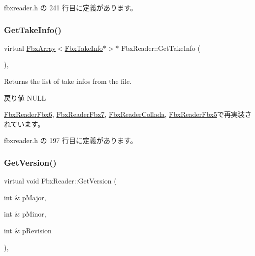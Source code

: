  fbxreader.\+h の 241 行目に定義があります。

\mbox{\label{class_fbx_reader_a9d7b40684bb3181219945eb0c73fb9d1}} 
\subsubsection{\texorpdfstring{Get\+Take\+Info()}{GetTakeInfo()}}
{\footnotesize\ttfamily virtual \hyperlink{class_fbx_array}{Fbx\+Array}$<$\hyperlink{class_fbx_take_info}{Fbx\+Take\+Info}$\ast$$>$$\ast$ Fbx\+Reader\+::\+Get\+Take\+Info (\begin{DoxyParamCaption}{ }\end{DoxyParamCaption})\hspace{0.3cm}{\ttfamily [inline]}, {\ttfamily [virtual]}}

Returns the list of take infos from the file. \begin{DoxyReturn}{戻り値}
N\+U\+LL 
\end{DoxyReturn}


\hyperlink{class_fbx_reader_fbx6_a6f90870b7572e7fcbc9832679a89d5f4}{Fbx\+Reader\+Fbx6}, \hyperlink{class_fbx_reader_fbx7_a220f07e0cb0c171279e1f98e0433bbee}{Fbx\+Reader\+Fbx7}, \hyperlink{class_fbx_reader_collada_af772ad8fc79672d06aa9ea6910b81ab0}{Fbx\+Reader\+Collada}, \hyperlink{class_fbx_reader_fbx5_a4680a5c4695d3692582d3ca8db71cd01}{Fbx\+Reader\+Fbx5}で再実装されています。



 fbxreader.\+h の 197 行目に定義があります。

\mbox{\label{class_fbx_reader_aa16aacbaa1c1e16fc208624b55dd6767}} 
\subsubsection{\texorpdfstring{Get\+Version()}{GetVersion()}}
{\footnotesize\ttfamily virtual void Fbx\+Reader\+::\+Get\+Version (\begin{DoxyParamCaption}\item[{int \&}]{p\+Major,  }\item[{int \&}]{p\+Minor,  }\item[{int \&}]{p\+Revision }\end{DoxyParamCaption})\hspace{0.3cm}{\ttfamily [inline]}, {\ttfamily [virtual]}}

